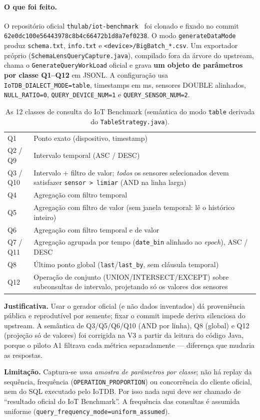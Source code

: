 \documentclass[11pt,a4paper]{article}
\newcommand{\caixa}[2][boxbg]{\par\smallskip\noindent\colorbox{#1}{\parbox{\dimexpr\linewidth-2\fboxsep}{#2}}\par\smallskip}
\newcommand{\just}[1]{\caixa{\textbf{Justificativa.} #1}}
\newcommand{\limit}[1]{\caixa[warnbg]{\textbf{Limitação.} #1}}
\begin{document}
\paragraph{O que foi feito.} O repositório oficial \texttt{thulab/iot-benchmark}~\cite{iotbench,iotbenchpaper} foi clonado e fixado no commit \texttt{62e0dc100e56443978c8b4c66472b1d8a7ef0238}. O modo \texttt{generateDataMode} produz \texttt{schema.txt}, \texttt{info.txt} e \texttt{<device>/BigBatch\_*.csv}. Um exportador próprio (\texttt{SchemaLensQueryCapture.java}), compilado fora da árvore do upstream, chama o \texttt{GenerateQueryWorkLoad} oficial e grava \textbf{um objeto de parâmetros por classe Q1--Q12} em JSONL. A configuração usa \texttt{IoTDB\_DIALECT\_MODE=table}, timestamps em ms, sensores DOUBLE alinhados, \texttt{NULL\_RATIO=0}, \texttt{QUERY\_DEVICE\_NUM=1} e \texttt{QUERY\_SENSOR\_NUM=2}.

\begin{table}[H]\centering\small
\caption{As 12 classes de consulta do IoT Benchmark (semântica do modo \texttt{table} derivada do \texttt{TableStrategy.java}).}
\begin{tabularx}{\linewidth}{@{}lY@{}}\toprule
Q1 & Ponto exato (dispositivo, timestamp)\\
Q2 / Q9 & Intervalo temporal (ASC / DESC)\\
Q3 / Q10 & Intervalo + filtro de valor; \emph{todos} os sensores selecionados devem satisfazer \texttt{sensor > limiar} (AND na linha larga)\\
Q4 & Agregação com filtro temporal\\
Q5 & Agregação com filtro de valor (sem janela temporal: lê o histórico inteiro)\\
Q6 & Agregação com filtro temporal e de valor\\
Q7 / Q11 & Agregação agrupada por tempo (\texttt{date\_bin} alinhado ao \emph{epoch}), ASC / DESC\\
Q8 & Último ponto global (\texttt{last}/\texttt{last\_by}, sem cláusula temporal)\\
Q12 & Operação de conjunto (UNION/INTERSECT/EXCEPT) sobre subconsultas de intervalo, projetando só os valores dos sensores\\
\bottomrule\end{tabularx}\end{table}

\just{Usar o gerador oficial (e não dados inventados) dá proveniência pública e reprodutível por semente; fixar o commit impede deriva silenciosa do upstream. A semântica de Q3/Q5/Q6/Q10 (AND por linha), Q8 (global) e Q12 (projeção só de valores) foi corrigida na V3 a partir da leitura do código Java, porque o piloto A1 filtrava cada métrica separadamente --- diferença que mudaria as respostas.}
\limit{Captura-se \emph{uma amostra de parâmetros por classe}; não há replay da sequência, frequência (\texttt{OPERATION\_PROPORTION}) ou concorrência do cliente oficial, nem do SQL executado pelo IoTDB. Por isso nada aqui deve ser chamado de ``resultado oficial do IoT Benchmark''. A frequência das consultas é assumida uniforme (\texttt{query\_frequency\_mode=uniform\_assumed}).}
\end{document}
